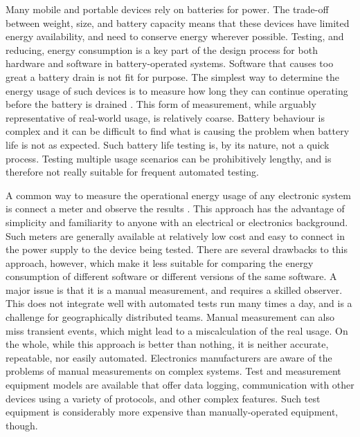 Many mobile and portable devices rely on batteries for power. The trade-off between weight, size, and battery capacity means that these devices  have limited energy availability, and need to conserve energy wherever possible. Testing, and reducing, energy consumption is a key part of the design process for both hardware and software in battery-operated systems. Software that causes too great a battery drain is not fit for purpose. The simplest way to determine the energy usage of such devices is to measure how long they can continue operating before the battery is drained \citep{Brown2006}. This form of measurement, while arguably representative of real-world usage, is relatively coarse. Battery behaviour is complex \citep{Panigrahi2001} and it can be difficult to find what is causing the problem when battery life is not as expected. Such battery life testing is, by its nature, not a quick process. Testing multiple usage scenarios can be prohibitively lengthy, and is therefore not really suitable for frequent automated testing.

A common way to measure the operational energy usage of any electronic system is connect a meter and observe the results \citep{derBauer2023}. This approach has the advantage of simplicity and familiarity to anyone with an electrical or electronics background. Such meters are generally available at relatively low cost and easy to connect in the power supply to the device being tested. There are several drawbacks to this approach, however, which make it less suitable for comparing the energy consumption of different software or different versions of the same software. A major issue is that it is a manual measurement, and requires a skilled observer. This does not integrate well with automated tests run many times a day, and is a challenge for geographically distributed teams. Manual measurement can also miss transient events, which might lead to a miscalculation of the real usage. On the whole, while this approach is better than nothing, it is neither accurate, repeatable, nor easily automated. Electronics manufacturers are aware of the problems of manual measurements on complex systems. Test and measurement equipment models are available that offer data logging, communication with other devices using a variety of protocols, and other complex features. Such test equipment is considerably more expensive than manually-operated equipment, though. 

